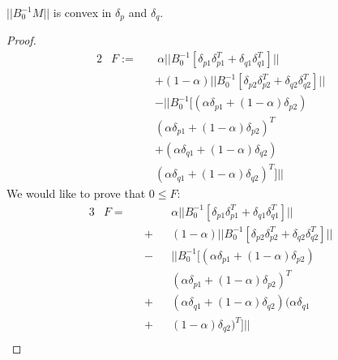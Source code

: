 \begin{lemma} \label{M}
$||B_0^{-1}M||$ is convex in $\delta_p$
and $\delta_q$.
\end{lemma}
\begin{proof}
\begin{alignat*}{2}
& F:=  && \ \alpha||B_0^{-1}[\delta_{p1}\delta_{p1}^T +
\delta_{q1}\delta_{q1}^T]|| \\
& && + (1-\alpha)||B_0^{-1}[\delta_{p2}\delta_{p2}^T +
\delta_{q2}\delta_{q2}^T]|| \\
& && - ||B_0^{-1}[(\alpha\delta_{p1}+(1-\alpha)\delta_{p2}) \\
& && (\alpha\delta_{p1} + (1-\alpha)\delta_{p2})^T  \\
& && + (\alpha\delta_{q1}+(1-\alpha)\delta_{q2}) \\
& && (\alpha\delta_{q1} + (1-\alpha)\delta_{q2})^T]||  
\end{alignat*}
We would like to prove that $0 \leq F$:
\begin{alignat*}{3}
& F=  && &&\alpha||B_0^{-1}[\delta_{p1}\delta_{p1}^T +
\delta_{q1}\delta_{q1}^T]|| \\
& && + &&(1-\alpha)||B_0^{-1}[\delta_{p2}\delta_{p2}^T +
\delta_{q2}\delta_{q2}^T]|| \\
& && - && ||B_0^{-1}[(\alpha\delta_{p1}+(1-\alpha)\delta_{p2}) \\
& && &&(\alpha\delta_{p1} + (1-\alpha)\delta_{p2})^T  \\
& && + && (\alpha\delta_{q1}+(1-\alpha)\delta_{q2})(\alpha\delta_{q1} \\
& && + && (1-\alpha)\delta_{q2})^T]||  \\


\end{alignat*}
\end{proof}
